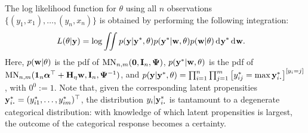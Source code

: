 The log likelihood function for $\theta$ using all $n$ observations $\{(y_1,x_1),\dots,(y_n,x_n)\}$ is obtained by performing the following integration:
\begin{align}\label{eq:iprobitlik}
  L(\theta|{\mathbf y}) 
  &= \log \iint p({\mathbf y}|{\mathbf y}^*,\theta) p({\mathbf y}^*|{\mathbf w},\theta) p({\mathbf w}|\theta) \operatorname{d}\hspace{0.5pt}\! {\mathbf y}^* \operatorname{d}\hspace{0.5pt}\! {\mathbf w}.
\end{align}
Here, $p({\mathbf w}|\theta)$ is the pdf of $\operatorname{MN}_{n,m}({\mathbf 0},{\mathbf I}_n,{\bm\Psi})$, $p({\mathbf y}^*|{\mathbf w},\theta)$ is the pdf of $\operatorname{MN}_{n,m}({\mathbf 1}_n{\bm\alpha}^\top + {\mathbf H}_\eta{\mathbf w},{\mathbf I}_n,{\bm\Psi}^{-1})$, and $p(\by|\by^*,\theta) = \prod_{i=1}^n \prod_{j=1}^m \big[y_{ij}^* 
    = \max \by^*_{i\bigcdot}\big]^{[y_i = j]}$, with $0^0 := 1$.
Note that, given the corresponding latent propensities $\by^*_{i\bigcdot} = (y_{i1}^*,\dots,y_{im}^*)^\top$, the distribution $y_i|\by^*_{i\bigcdot}$ is tantamount to a degenerate categorical distribution: with knowledge of which latent propensities is largest, the outcome of the categorical response becomes a certainty.

